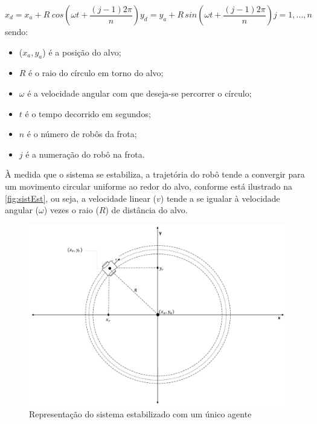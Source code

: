 \begin{subequations}
\begin{equation}
x_{d} = x_{a} + R\hspace{3pt}cos\left(\omega t + \dfrac{(j-1)2\pi}{n}\right)
\label{eq:xd_p2}
\end{equation}
\begin{equation}
y_{d} = y_{a} + R\hspace{2pt}sin\left(\omega t + \dfrac{(j-1)2\pi}{n}\right)
\label{eq:yd_p2}
\end{equation}
\begin{equation}
j = {1,...,n}
\label{eq:defj}
\end{equation}
\label{eq:posDesejada_p2}
\end{subequations}
sendo:
\begin{itemize}
	\item ($x_{a},y_{a}$) é a posição do alvo;
	\item $R$ é o raio do círculo em torno do alvo;
	\item $\omega$ é a velocidade angular com que deseja-se percorrer o círculo;
	\item $t$ é o tempo decorrido em segundos;
	\item $n$ é o número de robôs da frota;
	\item $j$ é a numeração do robô na frota. 
\end{itemize}

À medida que o sistema se estabiliza, a trajetória do robô tende a convergir para um movimento circular uniforme ao redor do alvo, conforme está ilustrado na \autoref{fig:sistEst}, ou seja, a velocidade linear ($v$) tende a se igualar à velocidade angular ($\omega$) vezes o raio ($R$) de distância do alvo. 

\begin{figure}[!htb]
	\centering
	\includegraphics[width=1.0\textwidth]{./04-figuras/sistEstavel2}
	\caption{Representação do sistema estabilizado com um único agente}
	\label{fig:sistEst}
\end{figure}





